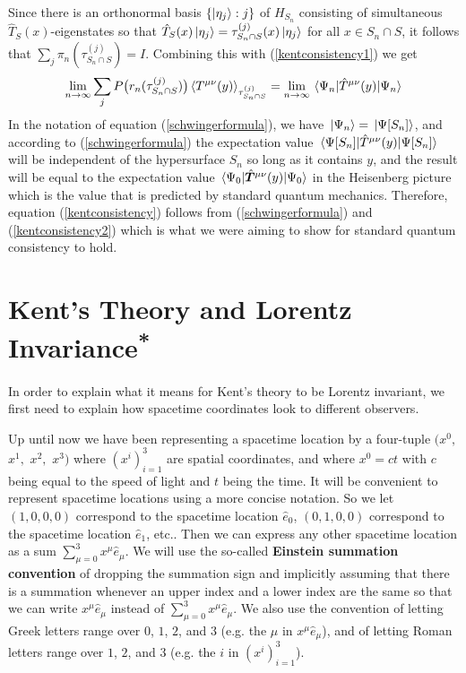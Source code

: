 Since there is an orthonormal basis $\{\ket{\eta_j}:j\}$ of $H_{S_n}$ consisting of simultaneous $\hat{T}_S(x)$-eigenstates so that $\hat{T}_S(x)\ket{\eta_j}=\tau^{(j)}_{S_n\cap S}(x)\ket{\eta_j}$ for all $x\in S_n\cap S$, it follows that $\sum_j \pi_{n}(\tau^{(j)}_{S_n\cap S})=I$. Combining this with (\ref{kentconsistency1}) we get
\begin{equation}\label{kentconsistency2}
	\lim_{n\rightarrow\infty}\sum_jP\big(r_n(\tau^{(j)}_{S_n\cap S})\big)\ev*{T^{\mu\nu}(y)}_{\tau^{(j)}_{S_n\cap S}}=\lim_{n\rightarrow\infty}\ev*{\hat{T}^{\mu\nu}(y)}{\Psi_n}
	\end{equation}
In the notation of equation (\ref{schwingerformula}), we have $\ket*{\Psi_n}=\ket*{\Psi[S_n]}$, and according to (\ref{schwingerformula}) the expectation value $\ev*{\hat{T}^{\mu\nu}(y)}{\Psi[S_n]}$ will be independent of the hypersurface $S_n$ so long as it contains $y$, and the result will be equal to the expectation value $\ev*{\hat{\bm{T}}^{\mu\nu}(y)}{\Psi_0}$ in the Heisenberg picture which is the value that is predicted by standard quantum mechanics. Therefore, equation (\ref{kentconsistency}) follows from (\ref{schwingerformula}) and (\ref{kentconsistency2}) which is what we were aiming to show for standard quantum consistency to hold.



\section{Kent's Theory and Lorentz Invariance\label{LorentzInvariance}\textsuperscript{*}}
In order to explain what it means for Kent's theory to be Lorentz invariant, we first need to explain how spacetime coordinates look to different observers. 

Up until now we have been representing a spacetime location by a four-tuple $(x^0,$ $x^1,$ $x^2,$ $x^3)$ where $(x^i)_{i=1}^3$ are spatial coordinates, and where $x^0=ct$ with $c$ being equal to the speed of light and $t$ being the time. It will be convenient to represent spacetime locations using a more concise notation. So we let $(1,0,0,0)$ correspond to the spacetime location $\hat{e}_0$, $(0,1,0,0)$ correspond to the spacetime location $\hat{e}_1$, etc.. Then we can express any other spacetime location  as a sum $\sum_{\mu=0}^3x^\mu\hat{e}_\mu$. We will use the so-called \textbf{Einstein summation convention}\label{Einsteinsum} of dropping the summation sign and implicitly assuming that there is a summation whenever an upper index and a lower index are the same so that we can write $x^\mu\hat{e}_\mu$ instead of $\sum_{\mu=0}^3x^\mu\hat{e}_\mu$. We also use the convention of letting Greek letters range over $0$, $1$, $2$, and $3$ (e.g. the $\mu$ in $x^\mu\hat{e}_\mu$), and of letting Roman letters range over $1$, $2$, and $3$ (e.g. the $i$ in $(x^i)_{i=1}^3$).

